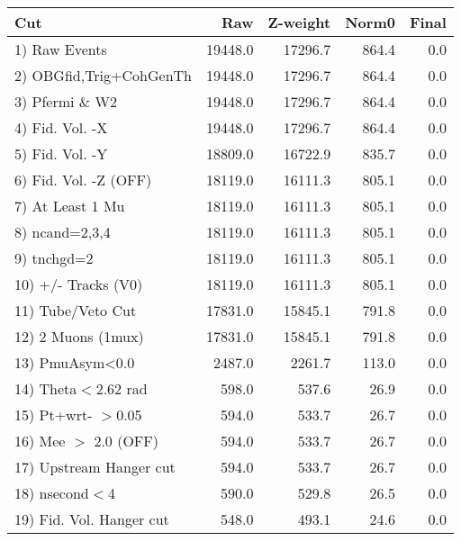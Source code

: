  \begin{table}[h!]\centering
 \begin{tabular}{||l||r|r|r|r||}
 \hline
 \hline
 Cut & Raw & Z-weight & Norm0 & Final \\
 \hline
  1) Raw Events           &     19448.0 &     17296.7 &       864.4 &         0.0 \\
  2) OBGfid,Trig+CohGenTh &     19448.0 &     17296.7 &       864.4 &         0.0 \\
  3) Pfermi \& W2         &     19448.0 &     17296.7 &       864.4 &         0.0 \\
  4) Fid. Vol. -X         &     19448.0 &     17296.7 &       864.4 &         0.0 \\
  5) Fid. Vol. -Y         &     18809.0 &     16722.9 &       835.7 &         0.0 \\
  6) Fid. Vol. -Z (OFF)   &     18119.0 &     16111.3 &       805.1 &         0.0 \\
  7) At Least 1 Mu        &     18119.0 &     16111.3 &       805.1 &         0.0 \\
  8) ncand=2,3,4          &     18119.0 &     16111.3 &       805.1 &         0.0 \\
  9) tnchgd=2             &     18119.0 &     16111.3 &       805.1 &         0.0 \\
 10) +/- Tracks (V0)      &     18119.0 &     16111.3 &       805.1 &         0.0 \\
 11) Tube/Veto Cut        &     17831.0 &     15845.1 &       791.8 &         0.0 \\
 12) 2 Muons (1mux)       &     17831.0 &     15845.1 &       791.8 &         0.0 \\
 13) PmuAsym<0.0          &      2487.0 &      2261.7 &       113.0 &         0.0 \\
 14) Theta$<$2.62 rad     &       598.0 &       537.6 &        26.9 &         0.0 \\
 15) Pt+wrt- $>$0.05      &       594.0 &       533.7 &        26.7 &         0.0 \\
 16) Mee $>$ 2.0  (OFF)   &       594.0 &       533.7 &        26.7 &         0.0 \\
 17) Upstream Hanger cut  &       594.0 &       533.7 &        26.7 &         0.0 \\
 18) nsecond$<$4          &       590.0 &       529.8 &        26.5 &         0.0 \\
 19) Fid. Vol. Hanger cut &       548.0 &       493.1 &        24.6 &         0.0 \\

\end{tabular}
\end{table}
